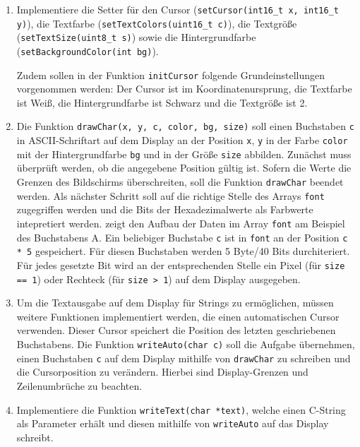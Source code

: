 \begin{enumerate}
\item 
Implementiere die Setter für den Cursor (\lstinline|setCursor(int16_t x, int16_t y)|), die Textfarbe (\lstinline|setTextColors(uint16_t c)|), die Textgröße (\lstinline|setTextSize(uint8_t s)|) sowie die Hintergrundfarbe (\lstinline|setBackgroundColor(int bg)|).

Zudem sollen in der Funktion \lstinline|initCursor| folgende Grundeinstellungen vorgenommen werden: 
Der Cursor ist im Koordinatenursprung, die Textfarbe ist Weiß, die Hintergrundfarbe ist Schwarz und die Textgröße ist 2.

\item
Die Funktion \lstinline|drawChar(x, y, c, color, bg, size)| soll einen Buchstaben \lstinline|c| in ASCII-Schriftart auf dem Display an der Position \lstinline|x|, \lstinline|y| in der Farbe \lstinline|color| mit der Hintergrundfarbe \lstinline|bg| und in der Größe \lstinline|size| abbilden.
Zunächst muss überprüft werden, ob die angegebene Position gültig ist.
Sofern die Werte die Grenzen des Bildschirms überschreiten, soll die Funktion \lstinline|drawChar| beendet werden.
Als nächster Schritt soll auf die richtige Stelle des Arrays \lstinline|font| zugegriffen werden und die Bits der Hexadezimalwerte als Farbwerte intepretiert werden.
 zeigt den Aufbau der Daten im Array \lstinline|font| am Beispiel des Buchstabens A.
Ein beliebiger Buchstabe \lstinline|c| ist in \lstinline|font| an der Position \lstinline|c * 5| gespeichert.
Für diesen Buchstaben werden 5 Byte/40 Bits durchiteriert.
Für jedes gesetzte Bit wird an der entsprechenden Stelle ein Pixel (für \lstinline|size == 1|) oder Rechteck (für \lstinline|size > 1|) auf dem Display ausgegeben.

\item 
Um die Textausgabe auf dem Display für Strings zu ermöglichen, müssen weitere Funktionen implementiert werden, die einen automatischen Cursor verwenden.
Dieser Cursor speichert die Position des letzten geschriebenen Buchstabens.
Die Funktion \lstinline|writeAuto(char c)| soll die Aufgabe übernehmen, einen Buchstaben \lstinline|c| auf dem Display mithilfe von \lstinline|drawChar| zu schreiben und die Cursorposition zu verändern.
Hierbei sind Display-Grenzen und Zeilenumbrüche zu beachten.

\item 
Implementiere die Funktion \lstinline|writeText(char *text)|, welche einen C-String als Parameter erhält und diesen mithilfe von \lstinline|writeAuto| auf das Display schreibt.


\end{enumerate}
